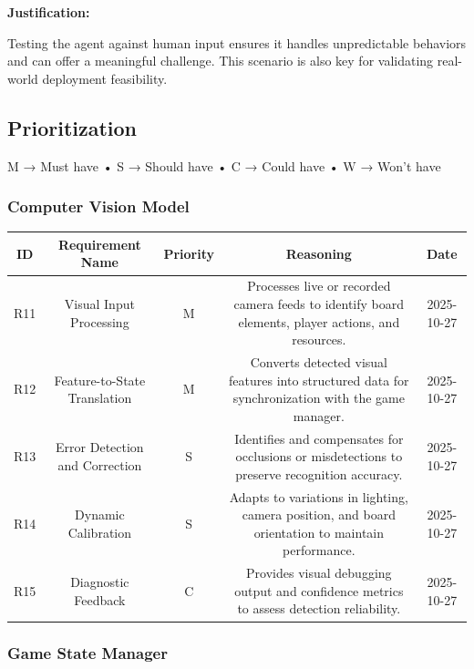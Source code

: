 \documentclass{article}
\begin{document}
\noindent\textbf{Justification:}

Testing the agent against human input ensures it handles unpredictable behaviors and can offer a meaningful challenge. This scenario is also key for validating real-world deployment feasibility.



\subsection{Prioritization}\label{subsec:prioritization}
M → Must have
• S → Should have
• C → Could have
• W → Won't have 

\vspace{1em}


\subsubsection*{Computer Vision Model}

\begin{tabular}{|c|c|c|c|c|}
\hline
\textbf{ID} & \textbf{Requirement Name} & \textbf{Priority} &
\textbf{Reasoning} & \textbf{Date} \\
\hline
R11 & Visual Input Processing & M &
\parbox[t]{4cm}{Processes live or recorded camera feeds to identify board elements, player actions, and resources.} &
2025-10-27 \\
\hline
R12 & Feature-to-State Translation & M &
\parbox[t]{4cm}{Converts detected visual features into structured \GameState{} data for synchronization with the game manager.} &
2025-10-27 \\
\hline
R13 & Error Detection and Correction & S &
\parbox[t]{4cm}{Identifies and compensates for occlusions or misdetections to preserve recognition accuracy.} &
2025-10-27 \\
\hline
R14 & Dynamic Calibration & S &
\parbox[t]{4cm}{Adapts to variations in lighting, camera position, and board orientation to maintain performance.} &
2025-10-27 \\
\hline
R15 & Diagnostic Feedback & C &
\parbox[t]{4cm}{Provides visual debugging output and confidence metrics to assess detection reliability.} &
2025-10-27 \\
\hline
\end{tabular}

\vspace{1em}


\subsubsection*{Game State Manager}
\end{document}
